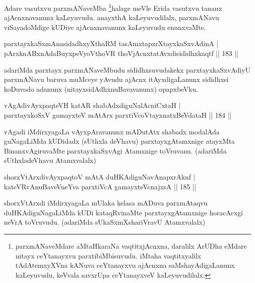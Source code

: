 \begin{artha}
Adare vasutxvu parxmANaveMba \footnote{parxmANaveMdare aMtaHkaraNa vaqtitxjAcnxna, daralilx ArUDha eMdare nitayx ceYtanayxvu parxtibiMbisuvudu. iMtaha vaqtitxyalilx tAdAtemxyXVna kANuva ceYtanayxvu ajAcnxna saMshayAdigaLanunx kaLeyuvudu, keVvala savxrUpa ceYtanayxveV kaLeyuvudilalx.}halage meVle Erida vasutxvu tananx ajAcnxnavanunx kaLeyuvudu. anayxthA kaLeyuvudilalx, parxmANavu viSayadoMdige kUDiye ajAcnxnavanunx kaLeyuvudu enunxvaMte.
\end{artha}

\begin{shl}
parxtayxkaSxmAnasidadhxyXthaRM tasAmxtapxrXtayxkaSxvAdinA | \\
pArxknABxnAdaBuyxpeVyoV\s thoVR thoV\s jAcnxtatAvxdisididhxkaqtf \hfill||  183 ||  
\end{shl}

\begin{artha}
adariMda parxtayx parxmANaveMbudu sididhxsuvudakekx parxtayxkaSxvAdiyU parxmANavu baruva muMceye yAvudu ajAcnx itAyxdigaLanunx sididhxsi koDuvodo adanunx (nitayxsidAdhxnuBavavanunx) opapxbeVku.
\end{artha}


\begin{shl}
vAgAdivAyxpaqteVH katAR shabAdxdiguNalAcniCxtaH | \\
parxtayxkoSxV gamayxteV mAtArx parxtiVcoV\s tayxnatxBeVdataH \hfill||  184 ||  
\end{shl}

\begin{artha}
vAgadi iMdirxyagaLa vAyxpAravanunx mADutAtx shabadx modalAda guNagaLiMda kUDidadx (sUthxla deVhavu) parxtayxgAtamxnige atayxMta BinanxvAgiruvaMte parxtayxkaSxvAgi Atamxnige toVruvanu. (adariMda sUthxladeVhavu Atamxvalalx)
\end{artha}

\begin{shl}
shorxVtArxdivAyxpaqtoV mAtA duHKAdiguNavAnapxrAknf | \\
kateVRvAnuBaveVneYva parxtiVcA gamayxteV\s cnajxsA \hfill||  185 ||  
\end{shl}

\begin{artha}
shorxVtArxdi iMdirxyagaLa mUlaka kelasa mADuva parxmAtaqvu duHKAdiguNagaLiMda kUDi kataqRvinaMte parxtayxgAtamxnige horacAcxgi neVrA toVruvudu. (adariMda sUkaSxmXshariVravU Atamxvalalx)
\end{artha}

